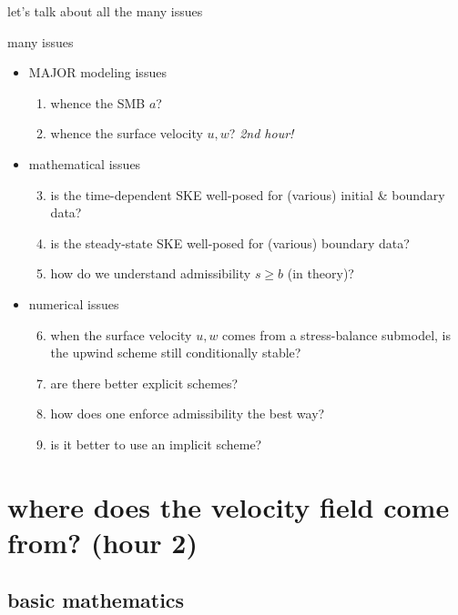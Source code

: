 \documentclass[10pt,dvipsnames]{beamer}
\newcommand{\comm}[1]{{\footnotesize \hfill \emph{#1}}}
\begin{document}
\begin{frame}[standout]
let's talk about all the many issues
\end{frame}


\begin{frame}{many issues}
\begin{itemize}
\item[] \alert{MAJOR modeling issues}
    \begin{enumerate}
    \item whence the SMB $a$?
    \item whence the surface velocity $u,w$? \comm{2nd hour!}
    \end{enumerate}
\item[] \alert{mathematical issues}
    \begin{enumerate}\setcounter{enumi}{2}
    \item is the time-dependent SKE well-posed for (various) initial \& boundary data?
    \item is the steady-state SKE well-posed for (various) boundary data?
    \item how do we understand admissibility $s\ge b$ (in theory)?
    \end{enumerate}
\item[] \alert{numerical issues}
    \begin{enumerate}\setcounter{enumi}{5}
    \item when the surface velocity $u, w$ comes from a stress-balance submodel, is the upwind scheme still conditionally stable?
    \item are there better explicit schemes?
    \item how does one enforce admissibility the best way?
    \item is it better to use an implicit scheme?
    \end{enumerate}
\end{itemize}
\end{frame}


\section[where does the velocity field come from?]{\textbf{where does the velocity field come from?} (hour 2)}

\subsection{basic mathematics}
\end{document}
